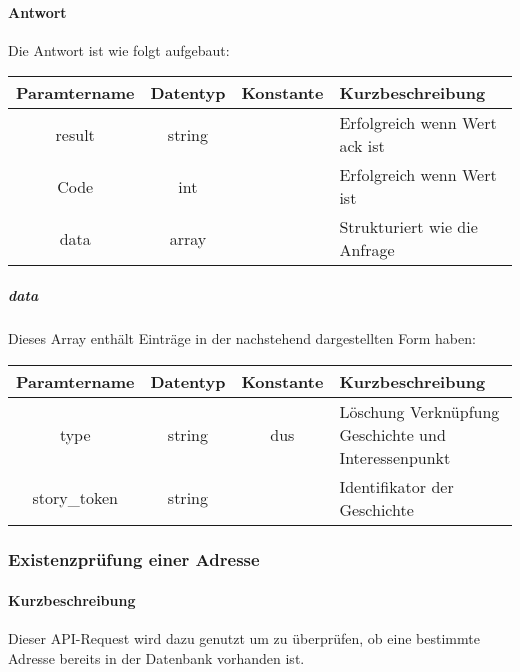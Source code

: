 \paragraph{Antwort}Die Antwort ist wie folgt aufgebaut:
\begin{table}[H]
	\begin{tabular}{|c|c|c|p{6.5cm}|}
		\hline
		\textbf{Paramtername} & \textbf{Datentyp} & \textbf{Konstante} & \textbf{Kurzbeschreibung}                                                                                               \\ \hline
		result              & string           &                 & Erfolgreich wenn Wert {\glqq ack\grqq} ist \\ \hline
		Code                & int              &                 & Erfolgreich wenn Wert {\glqq 0\grqq} ist \\ \hline
		data                & array            &                 & Strukturiert wie die Anfrage \\ \hline
	\end{tabular}
\end{table}
\subparagraph{data}Dieses Array enthält Einträge in der nachstehend dargestellten Form haben:
\begin{table}[H]
	\begin{tabular}{|c|c|c|p{6.5cm}|}
		\hline
		\textbf{Paramtername} & \textbf{Datentyp} & \textbf{Konstante} & \textbf{Kurzbeschreibung}    \\ \hline
		type                   & string          & dus             & Löschung Verknüpfung Geschichte und Interessenpunkt \\ \hline
		story\_token           & string          &                 & Identifikator der Geschichte \\ \hline
	\end{tabular}
\end{table}
\subsubsection{Existenzprüfung einer Adresse}
\paragraph{Kurzbeschreibung}Dieser API-Request wird dazu genutzt um zu überprüfen, ob eine bestimmte Adresse bereits in der Datenbank vorhanden ist.
